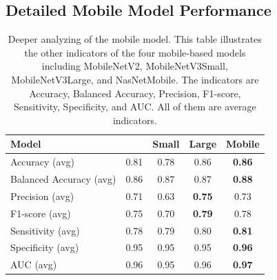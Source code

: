 \documentclass[sensors,article,accept,pdftex,moreauthors]{Definitions/mdpi}
\begin{document}
		\subsection[\appendixname~\thesection]{Detailed Mobile Model Performance}
		\begin{table}[H]
\caption{{Deeper%
} analyzing of the mobile model. This table illustrates the other indicators of the four mobile-based models including MobileNetV2, MobileNetV3Small, MobileNetV3Large, and NasNetMobile. The indicators are Accuracy, Balanced Accuracy, Precision, F1-score, Sensitivity, Specificity, and AUC. All of them are average indicators.}
\label{appendix-table:mobile-performance}
\setlength{\tabcolsep}{4.7mm}\begin{tabular}{l  c  c  c  c} 
	\toprule
	\textbf{Model} & \textbf{\cite{04381}} & \textbf{\cite{02244} Small} & \textbf{\cite{02244} Large} & \textbf{\cite{07012} Mobile}\\
	\midrule
	Accuracy (avg) & 0.81 & 0.78 & 0.86 & \textbf{{0.86}}\\
	\midrule
	Balanced Accuracy (avg) & 0.86 & 0.87 & 0.87 & \textbf{0.88}\\ 
	\midrule
	Precision (avg) & 0.71 & 0.63 & \textbf{0.75} & 0.73\\
	\midrule
	F1-score (avg) & 0.75 & 0.70 & \textbf{0.79} & 0.78\\
	\midrule
	Sensitivity (avg) & 0.78 & 0.79 & 0.80 & \textbf{0.81}\\ 
	\midrule
	Specificity (avg) & 0.95 & 0.95 & 0.95 & \textbf{0.96}\\
	\midrule
	AUC (avg) & 0.96 & 0.95 & 0.96 & \textbf{0.97}\\
	\bottomrule
\end{tabular}
		\end{table} 
		
\end{document}
